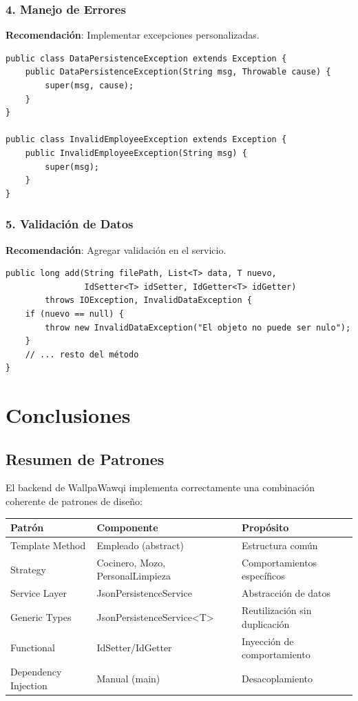 \documentclass[12pt, a4paper]{report}
\begin{document}
\subsection{4. Manejo de Errores}

\textbf{Recomendación}: Implementar excepciones personalizadas.

\begin{verbatim}
public class DataPersistenceException extends Exception {
    public DataPersistenceException(String msg, Throwable cause) {
        super(msg, cause);
    }
}

public class InvalidEmployeeException extends Exception {
    public InvalidEmployeeException(String msg) {
        super(msg);
    }
}
\end{verbatim}

\subsection{5. Validación de Datos}

\textbf{Recomendación}: Agregar validación en el servicio.

\begin{verbatim}
public long add(String filePath, List<T> data, T nuevo,
                IdSetter<T> idSetter, IdGetter<T> idGetter)
        throws IOException, InvalidDataException {
    if (nuevo == null) {
        throw new InvalidDataException("El objeto no puede ser nulo");
    }
    // ... resto del método
}
\end{verbatim}

\newpage

\chapter{Conclusiones}

\section{Resumen de Patrones}

El backend de WallpaWawqi implementa correctamente una combinación coherente de patrones de diseño:

\begin{table}[h]
\centering
\begin{tabular}{|l|l|l|}
\hline
\textbf{Patrón} & \textbf{Componente} & \textbf{Propósito} \\
\hline
Template Method & Empleado (abstract) & Estructura común \\
\hline
Strategy & Cocinero, Mozo, PersonalLimpieza & Comportamientos específicos \\
\hline
Service Layer & JsonPersistenceService & Abstracción de datos \\
\hline
Generic Types & JsonPersistenceService<T> & Reutilización sin duplicación \\
\hline
Functional & IdSetter/IdGetter & Inyección de comportamiento \\
\hline
Dependency Injection & Manual (main) & Desacoplamiento \\
\hline
\end{tabular}
\end{table}
\end{document}
